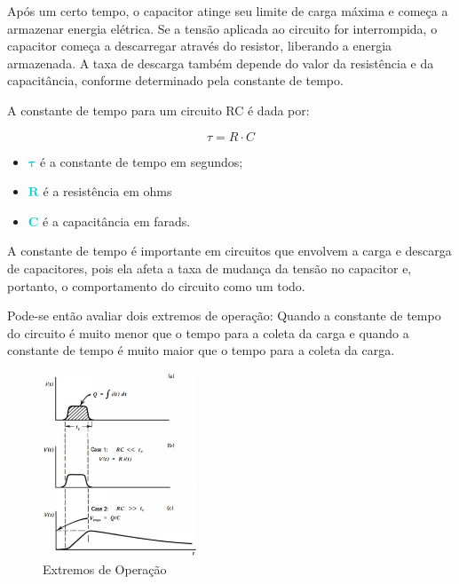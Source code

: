 \documentclass[11pt,a4paper]{article}
\newcounter{exemplo}
\begin{document}
			Após um certo tempo, o capacitor atinge seu limite de carga máxima e começa a armazenar energia elétrica. Se a tensão aplicada ao circuito for interrompida, o capacitor começa a descarregar através do resistor, liberando a energia armazenada. A taxa de descarga também depende do valor da resistência e da capacitância, conforme determinado pela constante de tempo.
			
			A constante de tempo para um circuito RC  é dada por:
			
				\begin{equation}
					\tau = R \cdot C
				\end{equation}

				\begin{exemplo}[onde,]
					\begin{itemize}
						\item \textcolor{DarkTurquoise}{$\mathbf{\tau}$} é a constante de tempo em segundos;
						\item \textcolor{DarkTurquoise}{$\mathbf{R}$} é a resistência em ohms
						\item \textcolor{DarkTurquoise}{$\mathbf{C}$} é a capacitância em farads.
					\end{itemize}
				\end{exemplo}
			
			A constante de tempo é importante em circuitos que envolvem a carga e descarga de capacitores, pois ela afeta a taxa de mudança da tensão no capacitor e, portanto, o comportamento do circuito como um todo.
			
			Pode-se então avaliar dois extremos de operação: Quando a constante de tempo do circuito é muito menor que o tempo para a coleta da carga e quando a constante de tempo é muito maior que o tempo para a coleta da carga.

			\begin{figure}
				\centering
				\includegraphics[width=0.41\textwidth]{Imagens/esquemaCorrentesCircuitoRC.jpg}
				\caption{Extremos de Operação}
				\label{fig:esquemaCorrenteCircuitoRC}
			\end{figure}
\end{document}
